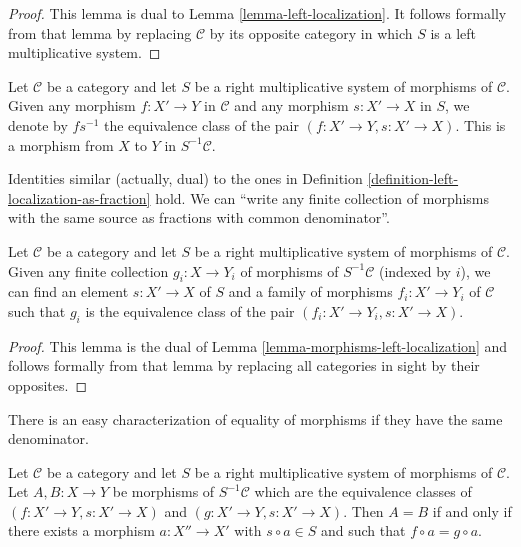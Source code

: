 \begin{proof}
This lemma is dual to
Lemma \ref{lemma-left-localization}.
It follows formally from that lemma by replacing
$\mathcal{C}$ by its opposite category in which
$S$ is a left multiplicative system.
\end{proof}

\begin{definition}
\label{definition-right-localization-as-fraction}
Let $\mathcal{C}$ be a category and let $S$ be a right multiplicative
system of morphisms of $\mathcal{C}$. Given any morphism
$f : X' \to Y$ in $\mathcal{C}$ and any morphism $s : X' \to X$ in
$S$, we denote by {\it $f s^{-1}$} the equivalence class of the pair
$(f : X' \to Y, s : X' \to X)$. This is a morphism from $X$ to $Y$
in $S^{-1} \mathcal{C}$.
\end{definition}

\noindent
Identities similar (actually, dual) to the ones in Definition
\ref{definition-left-localization-as-fraction} hold.
We can ``write any finite collection of morphisms with the same source
as fractions with common denominator''.

\begin{lemma}
\label{lemma-morphisms-right-localization}
Let $\mathcal{C}$ be a category and let $S$ be a right multiplicative
system of morphisms of $\mathcal{C}$. Given any finite collection
$g_i : X \to Y_i$ of morphisms of $S^{-1}\mathcal{C}$
(indexed by $i$),
we can find an element $s : X' \to X$ of $S$ and a family
of morphisms $f_i : X' \to Y_i$ of $\mathcal{C}$ such that
$g_i$ is the equivalence class of the pair
$(f_i : X' \to Y_i, s : X' \to X)$.
\end{lemma}

\begin{proof}
This lemma is the dual of
Lemma \ref{lemma-morphisms-left-localization}
and follows formally from that lemma by replacing all
categories in sight by their opposites.
\end{proof}

\noindent
There is an easy characterization of equality of morphisms if they
have the same denominator.

\begin{lemma}
\label{lemma-equality-morphisms-right-localization}
Let $\mathcal{C}$ be a category and let $S$ be a right multiplicative
system of morphisms of $\mathcal{C}$. Let $A, B : X \to Y$ be
morphisms of $S^{-1}\mathcal{C}$ which are the equivalence
classes of $(f : X' \to Y, s : X' \to X)$ and
$(g : X' \to Y, s : X' \to X)$. Then
$A = B$ if and only if there exists a morphism
$a : X'' \to X'$ with $s \circ a \in S$ and
such that $f \circ a = g \circ a$.
\end{lemma}

